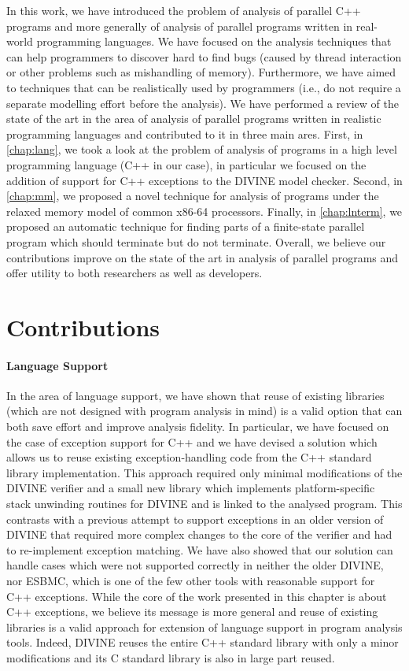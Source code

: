 In this work, we have introduced the problem of analysis of parallel C++ programs and more generally of analysis of parallel programs written in real-world programming languages.
We have focused on the analysis techniques that can help programmers to discover hard to find bugs (caused by thread interaction or other problems such as mishandling of memory).
Furthermore, we have aimed to techniques that can be realistically used by programmers (i.e., do not require a separate modelling effort before the analysis).
We have performed a review of the state of the art in the area of analysis of parallel programs written in realistic programming languages and contributed to it in three main ares.
First, in \autoref{chap:lang}, we took a look at the problem of analysis of programs in a high level programming language (C++ in our case), in particular we focused on the addition of support for C++ exceptions to the DIVINE model checker.
Second, in \autoref{chap:mm}, we proposed a novel technique for analysis of programs under the relaxed memory model of common x86-64 processors.
Finally, in \autoref{chap:lnterm}, we proposed an automatic technique for finding parts of a finite-state parallel program which should terminate but do not terminate.
Overall, we believe our contributions improve on the state of the art in analysis of parallel programs and offer utility to both researchers as well as developers.

\section{Contributions}

\paragraph{Language Support}

In the area of language support, we have shown that reuse of existing libraries (which are not designed with program analysis in mind) is a valid option that can both save effort and improve analysis fidelity.
In particular, we have focused on the case of exception support for C++ and we have devised a solution which allows us to reuse existing exception-handling code from the C++ standard library implementation.
This approach required only minimal modifications of the DIVINE verifier and a small new library which implements platform-specific stack unwinding routines for DIVINE and is linked to the analysed program.
This contrasts with a previous attempt to support exceptions in an older version of DIVINE that required more complex changes to the core of the verifier and had to re-implement exception matching.
We have also showed that our solution can handle cases which were not supported correctly in neither the older DIVINE, nor ESBMC, which is one of the few other tools with reasonable support for C++ exceptions.
While the core of the work presented in this chapter is about C++ exceptions, we believe its message is more general and reuse of existing libraries is a valid approach for extension of language support in program analysis tools.
Indeed, DIVINE reuses the entire C++ standard library with only a minor modifications and its C standard library is also in large part reused.

